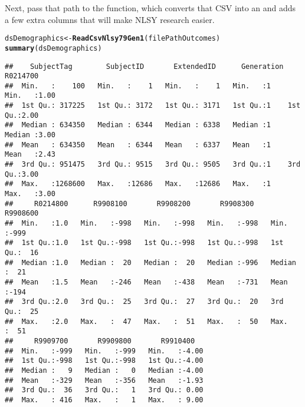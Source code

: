 \documentclass{article}\usepackage[]{graphicx}\usepackage[]{color}
\makeatletter
\newcommand{\hlstd}[1]{\textcolor[rgb]{0.345,0.345,0.345}{#1}}%
\newcommand{\hlkwb}[1]{\textcolor[rgb]{0.69,0.353,0.396}{#1}}%
\newcommand{\hlkwd}[1]{\textcolor[rgb]{0.737,0.353,0.396}{\textbf{#1}}}%
\newenvironment{kframe}{%
 \def\at@end@of@kframe{}%
 \ifinner\ifhmode%
  \def\at@end@of@kframe{\end{minipage}}%
  \begin{minipage}{\columnwidth}%
 \fi\fi%
 \def\FrameCommand##1{\hskip\@totalleftmargin \hskip-\fboxsep
 \colorbox{shadecolor}{##1}\hskip-\fboxsep
     \hskip-\linewidth \hskip-\@totalleftmargin \hskip\columnwidth}%
 \MakeFramed {\advance\hsize-\width
   \@totalleftmargin\z@ \linewidth\hsize
   \@setminipage}}%
 {\par\unskip\endMakeFramed%
 \at@end@of@kframe}
\newenvironment{knitrout}{}{} %
\makeatother
\begin{document}
Next, pass that path to the  function, which converts that CSV into an \R{}  and adds a few extra columns that will make NLSY research easier.
\begin{knitrout}
\color{fgcolor}\begin{kframe}
\begin{alltt}
\hlstd{dsDemographics} \hlkwb{<-} \hlkwd{ReadCsvNlsy79Gen1}\hlstd{(filePathOutcomes)}
\hlkwd{summary}\hlstd{(dsDemographics)}
\end{alltt}
\begin{verbatim}
##    SubjectTag        SubjectID       ExtendedID      Generation    R0214700   
##  Min.   :    100   Min.   :    1   Min.   :    1   Min.   :1    Min.   :1.00  
##  1st Qu.: 317225   1st Qu.: 3172   1st Qu.: 3171   1st Qu.:1    1st Qu.:2.00  
##  Median : 634350   Median : 6344   Median : 6338   Median :1    Median :3.00  
##  Mean   : 634350   Mean   : 6344   Mean   : 6337   Mean   :1    Mean   :2.43  
##  3rd Qu.: 951475   3rd Qu.: 9515   3rd Qu.: 9505   3rd Qu.:1    3rd Qu.:3.00  
##  Max.   :1268600   Max.   :12686   Max.   :12686   Max.   :1    Max.   :3.00  
##     R0214800      R9908100       R9908200       R9908300       R9908600   
##  Min.   :1.0   Min.   :-998   Min.   :-998   Min.   :-998   Min.   :-999  
##  1st Qu.:1.0   1st Qu.:-998   1st Qu.:-998   1st Qu.:-998   1st Qu.:  16  
##  Median :1.0   Median :  20   Median :  20   Median :-996   Median :  21  
##  Mean   :1.5   Mean   :-246   Mean   :-438   Mean   :-731   Mean   :-194  
##  3rd Qu.:2.0   3rd Qu.:  25   3rd Qu.:  27   3rd Qu.:  20   3rd Qu.:  25  
##  Max.   :2.0   Max.   :  47   Max.   :  51   Max.   :  50   Max.   :  51  
##     R9909700       R9909800       R9910400    
##  Min.   :-999   Min.   :-999   Min.   :-4.00  
##  1st Qu.:-998   1st Qu.:-998   1st Qu.:-4.00  
##  Median :   9   Median :   0   Median :-4.00  
##  Mean   :-329   Mean   :-356   Mean   :-1.93  
##  3rd Qu.:  36   3rd Qu.:   1   3rd Qu.: 0.00  
##  Max.   : 416   Max.   :   1   Max.   : 9.00
\end{verbatim}
\end{kframe}
\end{knitrout}
\end{document}
